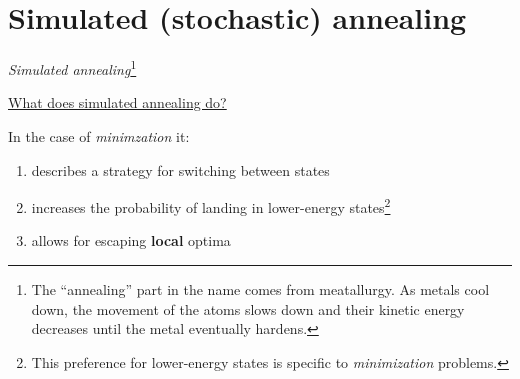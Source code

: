 \section{Simulated (stochastic) annealing}

\begin{frame}

\emph{Simulated annealing}\footnote{
The ``annealing'' part in the name comes from meatallurgy. As metals cool down, the movement of the atoms slows down and their kinetic energy decreases until the metal eventually hardens.
}

\underline{What does simulated annealing do?}

In the case of \emph{minimzation} it:

\begin{enumerate}
\item describes a strategy for switching between states
\item increases the probability of landing in lower-energy states\footnote{This preference for lower-energy states is specific to \emph{minimization} problems.}
\item allows for escaping \textbf{local} optima
\end{enumerate}

\end{frame}

